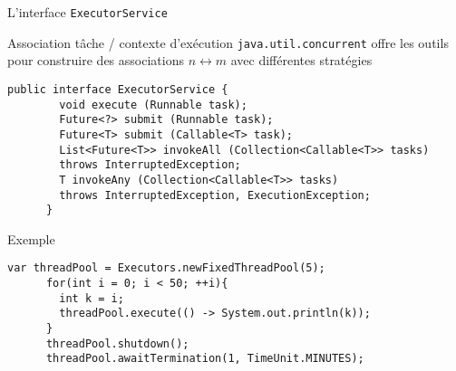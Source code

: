
\begingroup

\begin{frame}[fragile]{L'interface \texttt{ExecutorService}}

  \begin{block}{Association tâche / contexte d'exécution}
    \texttt{java.util.concurrent} offre les outils pour construire  des associations $n \leftrightarrow m$ avec différentes stratégies

    \begin{lstlisting}[gobble=6]
      public interface ExecutorService {
        void execute (Runnable task);
        Future<?> submit (Runnable task);
        Future<T> submit (Callable<T> task);
        List<Future<T>> invokeAll (Collection<Callable<T>> tasks)
        throws InterruptedException;
        T invokeAny (Collection<Callable<T>> tasks)
        throws InterruptedException, ExecutionException;
      }
    \end{lstlisting}
  \end{block}

  \begin{exampleblock}{Exemple}
    \begin{lstlisting}[gobble=6]
      var threadPool = Executors.newFixedThreadPool(5);
      for(int i = 0; i < 50; ++i){
        int k = i;
        threadPool.execute(() -> System.out.println(k));
      }
      threadPool.shutdown();
      threadPool.awaitTermination(1, TimeUnit.MINUTES);
    \end{lstlisting}
  \end{exampleblock}
  
\end{frame}

\endgroup
\endinput
